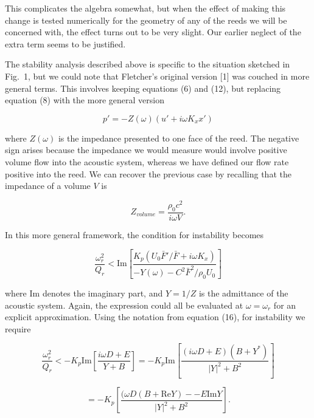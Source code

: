   This complicates the algebra somewhat, but when the effect of making this 
  change is tested numerically for the geometry of any of the reeds we will be 
  concerned with, the effect turns out to be very slight. Our earlier neglect 
  of the extra term seems to be justified. 

  The stability analysis described above is specific to the situation sketched 
  in Fig.\ 1, but we could note that Fletcher's original version [1] was 
  couched in more general terms. This involves keeping equations (6) and (12), 
  but replacing equation (8) with the more general version 

  \begin{equation*}p'=-Z(\omega) \left(u'+i \omega K_x x' \right) 
  \tag{20}\end{equation*} 

  \noindent{}where $Z(\omega)$ is the impedance presented to one face of the 
  reed. The negative sign arises because the impedance we would measure would 
  involve positive volume flow into the acoustic system, whereas we have 
  defined our flow rate positive into the reed. We can recover the previous 
  case by recalling that the impedance of a volume $V$ is 

  \begin{equation*}Z_{volume}=\dfrac{\rho_0 c^2}{i \omega V}. 
  \tag{21}\end{equation*} 

  In this more general framework, the condition for instability becomes 

  \begin{equation*}\dfrac{\omega_r^2}{Q_r} < \mathrm{Im}\left[\dfrac{K_p(U_0 
  \bar{F}'/\bar{F} + i \omega K_x)}{-Y(\omega)-C^2 \bar{F}^2/\rho_0 U_0}\right] 
  \tag{22}\end{equation*} 

  \noindent{}where $\mathrm{Im}$ denotes the imaginary part, and $Y=1/Z$ is the 
  admittance of the acoustic system. Again, the expression could all be 
  evaluated at $\omega=\omega_r$ for an explicit approximation. Using the 
  notation from equation (16), for instability we require 

  \begin{equation*}\dfrac{\omega_r^2}{Q_r} <-K_p \mathrm{Im} \left[ \dfrac{i 
  \omega D + E}{Y +B}\right]=-K_p\mathrm{Im} \left[\dfrac{(i \omega D + 
  E)(B+Y^*)}{|Y|^2+B^2}\right]\end{equation*} 

  \begin{equation*}=-K_p\left[\dfrac{(\omega D (B+\mathrm{Re} Y) -- E 
  \mathrm{Im} Y}{|Y|^2+B^2}\right] . \tag{23}\end{equation*} 

